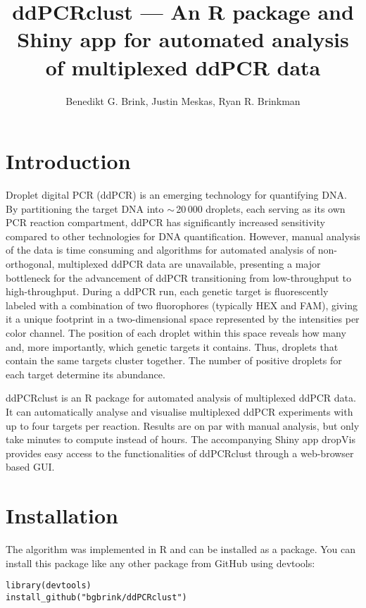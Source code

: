 \documentclass{article}
\title{ddPCRclust --- An R package and Shiny app for automated analysis of multiplexed ddPCR data}
\author{Benedikt G. Brink, Justin Meskas, Ryan R. Brinkman}
\begin{document}


\maketitle

\tableofcontents

\section{Introduction}

Droplet digital PCR (ddPCR) is an emerging technology for quantifying DNA. By partitioning the target DNA into $\sim\,$20$\,$000 droplets, each serving as its own PCR reaction compartment, ddPCR has significantly increased sensitivity compared to other technologies for DNA quantification. However, manual analysis of the data is time consuming and algorithms for automated analysis of non-orthogonal, multiplexed ddPCR data are unavailable, presenting a major bottleneck for the advancement of ddPCR transitioning from low-throughput to high-throughput. During a ddPCR run, each genetic target is fluorescently labeled with a combination of two fluorophores (typically HEX and FAM), giving it a unique footprint in a two-dimensional space represented by the intensities per color channel. The position of each droplet within this space reveals how many and, more importantly, which genetic targets it contains. Thus, droplets that contain the same targets cluster together. The number of positive droplets for each target determine its abundance. 

ddPCRclust is an R package for automated analysis of multiplexed ddPCR data. It can automatically analyse and visualise multiplexed ddPCR experiments with up to four targets per reaction. Results are on par with manual analysis, but only take minutes to compute instead of hours. The accompanying Shiny app dropVis provides easy access to the functionalities of ddPCRclust through a web-browser based GUI.

\section{Installation}
The algorithm was implemented in R and can be installed as a package. You can install this package like any other package from GitHub using devtools:

\begin{verbatim}
library(devtools)
install_github("bgbrink/ddPCRclust")
\end{verbatim}
\end{document}
